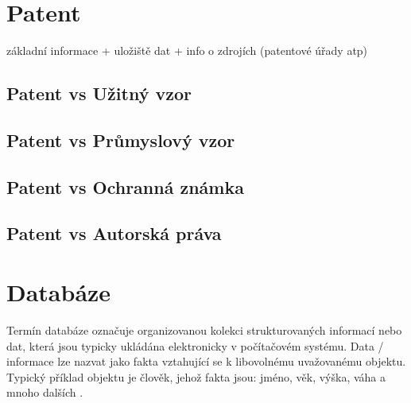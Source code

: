\chapter{Patent}
základní informace + uložiště dat + info o zdrojích (patentové úřady atp) \newline
\section{Patent vs Užitný vzor}
\section{Patent vs Průmyslový vzor}
\section{Patent vs Ochranná známka}
\section{Patent vs Autorská práva}



\chapter{Databáze}

Termín databáze označuje organizovanou kolekci strukturovaných informací nebo dat, která jsou typicky ukládána elektronicky v počítačovém systému. Data / informace lze nazvat jako fakta vztahující se k libovolnému uvažovanému objektu. Typický příklad objektu je člověk, jehož fakta jsou: jméno, věk, výška, váha a mnoho dalších \cite{guru99Database}.\newline

